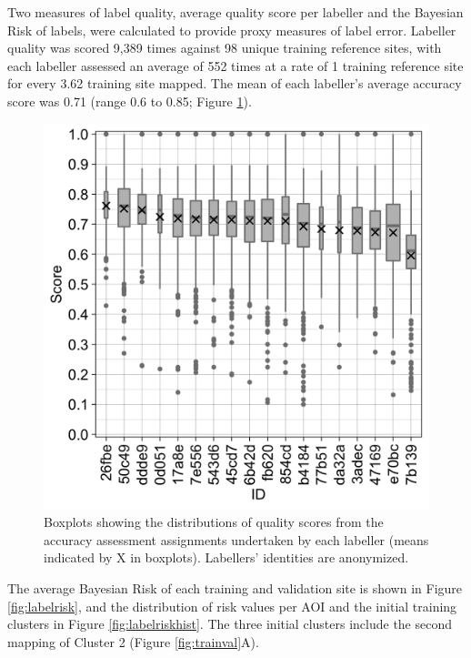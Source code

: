 \documentclass[
  11pt,
  a4paper]{article}
\begin{document}
Two measures of label quality, average quality score per labeller and
the Bayesian Risk of labels, were calculated to provide proxy measures
of label error. Labeller quality was scored 9,389 times against 98
unique training reference sites, with each labeller assessed an average
of 552 times at a rate of 1 training reference site for every 3.62
training site mapped. The mean of each labeller's average accuracy score
was 0.71 (range 0.6 to 0.85; Figure \ref{fig:labelqual}).

\begin{figure}[!ht]

{\centering \includegraphics[width=0.7\linewidth,]{figures/si_label_quality} 

}

\caption{Boxplots showing the distributions of quality scores from the accuracy assessment assignments undertaken by each labeller (means indicated by X in boxplots). Labellers' identities are anonymized.}\label{fig:labelqual}
\end{figure}

The average Bayesian Risk of each training and validation site is shown
in Figure \ref{fig:labelrisk}, and the distribution of risk values per
AOI and the initial training clusters in Figure \ref{fig:labelriskhist}.
The three initial clusters include the second mapping of Cluster 2
(Figure \ref{fig:trainval}A).
\end{document}
